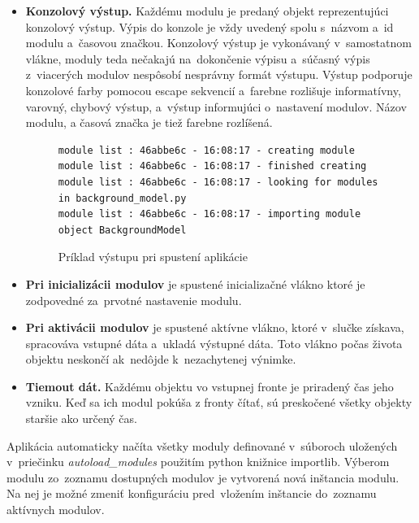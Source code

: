 \begin{itemize}
                \item \textbf{Konzolový výstup.} Každému modulu je predaný objekt reprezentujúci konzolový výstup. Výpis do konzole je vždy uvedený spolu s~názvom a~id modulu a~časovou značkou. Konzolový výstup je vykonávaný v~samostatnom vlákne, moduly teda nečakajú na~dokončenie výpisu a~súčasný výpis z~viacerých modulov nespôsobí nesprávny formát výstupu. Výstup podporuje konzolové farby pomocou escape sekvencií a~farebne rozlišuje informatívny, varovný, chybový výstup, a~výstup informujúci o~nastavení modulov. Názov modulu, a časová značka je tiež farebne rozlíšená.
                \begin{figure}[H]
                    \centering
                    \begin{lstlisting}
module list : 46abbe6c - 16:08:17 - creating module
module list : 46abbe6c - 16:08:17 - finished creating
module list : 46abbe6c - 16:08:17 - looking for modules
in background_model.py
module list : 46abbe6c - 16:08:17 - importing module
object BackgroundModel
                    \end{lstlisting}
                    \caption{Príklad výstupu pri spustení aplikácie}
                \end{figure}
                \item \textbf{Pri inicializácii modulov} je spustené inicializačné vlákno ktoré je zodpovedné za~prvotné nastavenie modulu.
                \item \textbf{Pri aktivácii modulov} je spustené aktívne vlákno, ktoré v~slučke získava, spracováva vstupné dáta a~ukladá výstupné dáta. Toto vlákno počas života objektu neskončí ak~nedôjde k~nezachytenej výnimke.
                \item \textbf{Tiemout dát.} Každému objektu vo vstupnej fronte je priradený čas jeho vzniku. Keď sa ich modul pokúša z fronty čítať, sú preskočené všetky objekty staršie ako určený čas.
            \end{itemize}

            Aplikácia automaticky načíta všetky moduly definované v~súboroch uložených v~priečinku \emph{autoload\_modules} použitím python knižnice importlib. Výberom modulu zo~zoznamu dostupných modulov je vytvorená nová inštancia modulu. Na nej je možné zmeniť konfiguráciu pred~vložením inštancie do~zoznamu aktívnych modulov.

